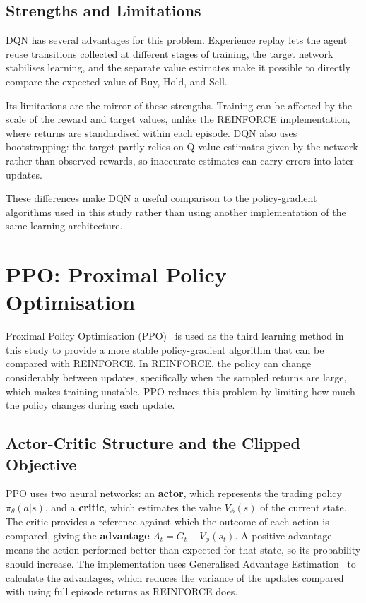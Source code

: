 \subsection{Strengths and Limitations}

DQN has several advantages for this problem. Experience replay lets the
agent reuse transitions collected at different stages of training, the
target network stabilises learning, and the separate value estimates
make it possible to directly compare the expected value of Buy, Hold,
and Sell.

Its limitations are the mirror of these strengths. Training can be
affected by the scale of the reward and target values, unlike the
REINFORCE implementation, where returns are standardised within each
episode. DQN also uses bootstrapping: the target partly relies on
Q-value estimates given by the network rather than observed rewards, so
inaccurate estimates can carry errors into later updates.

These differences make DQN a useful comparison to the policy-gradient
algorithms used in this study rather than using another implementation
of the same learning architecture.

\section{PPO: Proximal Policy Optimisation}

Proximal Policy Optimisation (PPO)~\cite{schulman2017ppo} is used as the
third learning method in this study to provide a more stable
policy-gradient algorithm that can be compared with REINFORCE. In
REINFORCE, the policy can change considerably between updates,
specifically when the sampled returns are large, which makes training
unstable. PPO reduces this problem by limiting how much the policy
changes during each update.

\subsection{Actor-Critic Structure and the Clipped Objective}

PPO uses two neural networks: an \textbf{actor}, which represents the
trading policy \(\pi_{\theta}\left( a|s \right)\), and a
\textbf{critic}, which estimates the value \(V_{\phi}(s)\) of the
current state. The critic provides a reference against which the outcome
of each action is compared, giving the \textbf{advantage}
\(A_{t} = G_{t} - V_{\phi}\left( s_{t} \right)\). A positive advantage
means the action performed better than expected for that state, so its
probability should increase. The implementation uses Generalised
Advantage Estimation~\cite{schulman2016gae} to calculate the advantages,
which reduces the variance of the updates compared with using full
episode returns as REINFORCE does.

